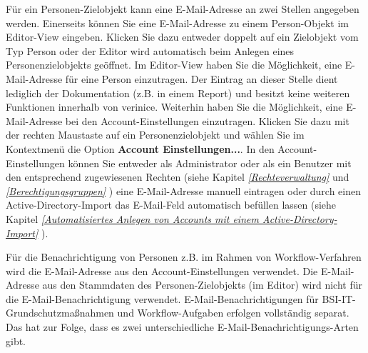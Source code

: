 \documentclass[a4paper,10pt]{book}
\begin{document}
Für ein Personen-Zielobjekt kann eine E-Mail-Adresse an zwei Stellen angegeben
werden. Einerseits können Sie eine E-Mail-Adresse zu einem Person-Objekt im
Editor-View eingeben. Klicken Sie dazu entweder doppelt auf ein Zielobjekt vom
Typ Person oder der Editor wird automatisch beim Anlegen eines
Personenzielobjekts geöffnet. Im Editor-View haben Sie die Möglichkeit, eine
E-Mail-Adresse für eine Person einzutragen. Der Eintrag an dieser Stelle dient
lediglich der Dokumentation (z.B. in einem Report) und besitzt keine weiteren
Funktionen innerhalb von verinice. Weiterhin haben Sie die Möglichkeit, eine
E-Mail-Adresse bei den Account-Einstellungen einzutragen. Klicken Sie dazu mit
der rechten Maustaste auf ein Personenzielobjekt und wählen Sie im Kontextmenü
die Option \textbf{Account Einstellungen...}. In den Account-Einstellungen
können Sie entweder als Administrator oder als ein Benutzer mit den entsprechend
zugewiesenen Rechten (siehe Kapitel {\em \ref{Rechteverwaltung}
} und {\em \ref{Berechtigungsgruppen}
}) eine E-Mail-Adresse manuell eintragen oder
durch einen Active-Directory-Import das E-Mail-Feld automatisch befüllen lassen
(siehe Kapitel {\em \ref{Automatisiertes Anlegen von Accounts mit einem
Active-Directory-Import} }).

Für die Benachrichtigung von Personen z.B. im Rahmen von Workflow-Verfahren wird die E-Mail-Adresse aus den Account-Einstellungen verwendet.
Die E-Mail-Adresse aus den Stammdaten des Personen-Zielobjekts (im Editor) wird nicht für die E-Mail-Benachrichtigung verwendet.
\newline
E-Mail-Benachrichtigungen für BSI-IT-Grundschutzmaßnahmen und Workflow-Aufgaben erfolgen vollständig separat. Das hat zur Folge, dass es zwei unterschiedliche
E-Mail-Benachrichtigungs-Arten gibt.
\newline
\end{document}
